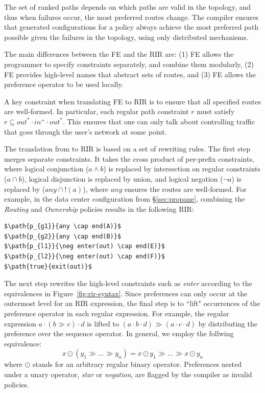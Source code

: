 The set of ranked paths depends on which paths are valid in the topology, and thus when failures occur, the most preferred routes change. The \sysname compiler ensures that generated configurations for a policy always achieve the most preferred path possible given the failures in the topology, using only distributed mechanisms.



The main differences between the \sysname FE and the RIR are: (1) FE allows the programmer to specify constraints separately, and combine them  modularly, (2) FE provides high-level names that abstract sets of routes, and (3) FE allows the preference operator to be used locally.

A key constraint when translating FE to RIR is to ensure that all specified routes are well-formed. In particular, each regular path constraint $r$ must satisfy $r \subseteq out^* \cdot in^+ \cdot out^*$. This ensures that one can only talk about controlling traffic that goes through the user's network at some point.

The translation from \sysname to RIR is based on a set of rewriting rules.
The first step merges separate constraints. It takes the cross product of per-prefix constraints, where logical conjunction ($a \wedge b$) is replaced by intersection on regular constraints ($a \cap b$), logical disjunction is replaced by union, and logical negation ($\neg a$) is replaced by ($any \cap !(a)$), where $any$ ensures the routes are well-formed.
%
For example, in the data center configuration from \S\ref{sec:propane}, combining the \textit{Routing} and \textit{Ownership} policies results in the following RIR:

\begin{lstlisting}[mathescape=true]
$\path{p_{g1}}{any \cap end(A)}$
$\path{p_{g2}}{any \cap end(B)}$
$\path{p_{l1}}{\neg enter(out) \cap end(E)}$
$\path{p_{l2}}{\neg enter(out) \cap end(F)}$
$\path{true}{exit(out)}$
\end{lstlisting}

The next step rewrites the high-level constraints such as \textit{enter} according to the equivalences in Figure~\ref{fig:rir-syntax}. Since preferences can only occur at the outermost level for an RIR expression, the final step is to ``lift" occurrences of the preference operator in each regular expression. For example, the regular expression $a \cdot (b \gg c) \cdot d$ is lifted to $(a \cdot b \cdot d) \gg (a \cdot c \cdot d)$ by distributing the preference over the sequence operator. In general, we employ the follwing equivalence:
%
$$x \odot (y_1 \gg \dots \gg y_n) = x \odot y_1 \gg \dots \gg x \odot y_n$$
%
where $\odot$ stands for an arbitrary regular binary operator. Preferences nested under a unary operator, \textit{star} or \textit{negation}, are flagged by the compiler as invalid policies.




